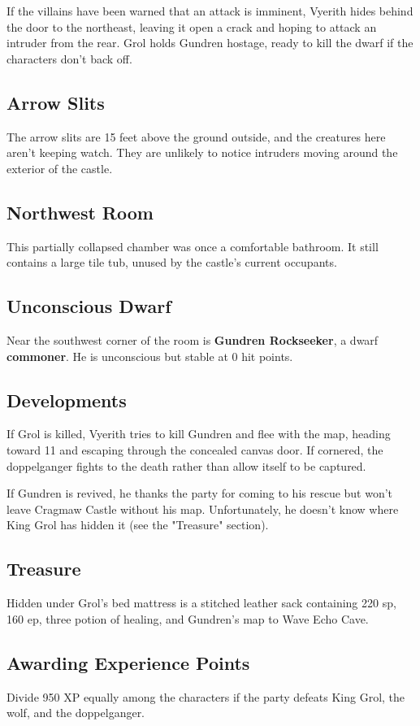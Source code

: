 \documentclass[10pt,a4paper,twoside,bg=print,twocolumn,openany,nodeprecatedcode]{dndbook}
\begin{document}
If the villains have been warned that an attack is imminent, Vyerith hides behind the door to the northeast, leaving it open a crack and hoping to attack an intruder from the rear. Grol holds Gundren hostage, ready to kill the dwarf if the characters don't back off.

\subsection{Arrow Slits}
The arrow slits are 15 feet above the ground outside, and the creatures here aren't keeping watch. They are unlikely to notice intruders moving around the exterior of the castle.

\subsection{Northwest Room}
This partially collapsed chamber was once a comfortable bathroom. It still contains a large tile tub, unused by the castle's current occupants.

\subsection{Unconscious Dwarf}
Near the southwest corner of the room is \textbf{Gundren Rockseeker}, a dwarf \textbf{commoner}. He is unconscious but stable at 0 hit points.

\subsection{Developments}
If Grol is killed, Vyerith tries to kill Gundren and flee with the map, heading toward 11 and escaping through the concealed canvas door. If cornered, the doppelganger fights to the death rather than allow itself to be captured.

If Gundren is revived, he thanks the party for coming to his rescue but won't leave Cragmaw Castle without his map. Unfortunately, he doesn't know where King Grol has hidden it (see the "Treasure" section).

\subsection{Treasure}
Hidden under Grol's bed mattress is a stitched leather sack containing 220 sp, 160 ep, three potion of healing, and Gundren's map to Wave Echo Cave.

\subsection{Awarding Experience Points}
Divide 950 XP equally among the characters if the party defeats King Grol, the wolf, and the doppelganger.
\end{document}
